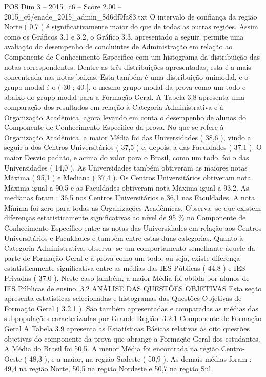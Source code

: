 \begin{textsample}{POS Dim 3 – 2015\_c6 – Score 2.00 – 2015\_c6/enade\_2015\_admin\_8d6df9fa83.txt}
O intervalo de confiança da região Norte ( 0,7 ) é significativamente maior do que de todas as outras regiões.
Assim como os Gráficos 3.1 e 3.2, o Gráfico 3.3, apresentado a seguir, permite uma avaliação do desempenho de concluintes de Administração em relação ao Componente de Conhecimento Específico com um histograma da distribuição das notas correspondentes.
Dentre as três distribuições apresentadas, esta é a mais concentrada nas notas baixas.
Esta também é uma distribuição unimodal, e o grupo modal é o ( 30 ; 40 ], o mesmo grupo modal da prova como um todo e abaixo do grupo modal para a Formação Geral.
A Tabela 3.8 apresenta uma comparação dos resultados em relação à Categoria Administrativa e à Organização Acadêmica, agora levando em conta o desempenho de alunos do Componente de Conhecimento Específico da prova.
No que se refere à Organização Acadêmica, a maior Média foi das Universidades ( 38,6 ), vindo a seguir a dos Centros Universitários ( 37,5 ) e, depois, a das Faculdades ( 37,1 ).
O maior Desvio padrão, e acima do valor para o Brasil, como um todo, foi o das Universidades ( 14,0 ).
As Universidades também obtiveram as maiores notas Máxima ( 95,1 ) e Mediana ( 37,4 ).
Os Centros Universitários obtiveram nota Máxima igual a 90,5 e as Faculdades obtiveram nota Máxima igual a 93,2.
As medianas foram : 36,5 nos Centros Universitários e 36,1 nas Faculdades.
A nota Mínima foi zero para todas as Organizações Acadêmicas.
Observa -se que existem diferenças estatisticamente significativas ao nível de 95 \% no Componente de Conhecimento Específico entre as notas das Universidades em relação aos Centros Universitários e Faculdades e também entre estas duas categorias.
Quanto à Categoria Administrativa, observa -se um comportamento semelhante àquele da parte de Formação Geral e à prova como um todo, ou seja, existe diferença estatisticamente significativa entre as médias das IES Públicas ( 44,8 ) e IES Privadas ( 37,0 ).
Neste caso também, a maior Média foi obtida por alunos de IES Públicas de ensino. 3.2 ANÁLISE DAS QUESTÕES OBJETIVAS Esta seção apresenta estatísticas selecionadas e histogramas das Questões Objetivas de Formação Geral ( 3.2.1 ).
São também apresentadas e comparadas as médias das subpopulações caracterizadas por Grande Região. 3.2.1 Componente de Formação Geral A Tabela 3.9 apresenta as Estatísticas Básicas relativas às oito questões objetivas do componente da prova que abrange a Formação Geral dos estudantes.
A Média do Brasil foi 50,5.
A menor Média foi encontrada na região Centro-Oeste ( 48,3 ), e a maior, na região Sudeste ( 50,9 ).
As demais médias foram : 49,4 na região Norte, 50,5 na região Nordeste e 50,7 na região Sul.

\end{textsample}
